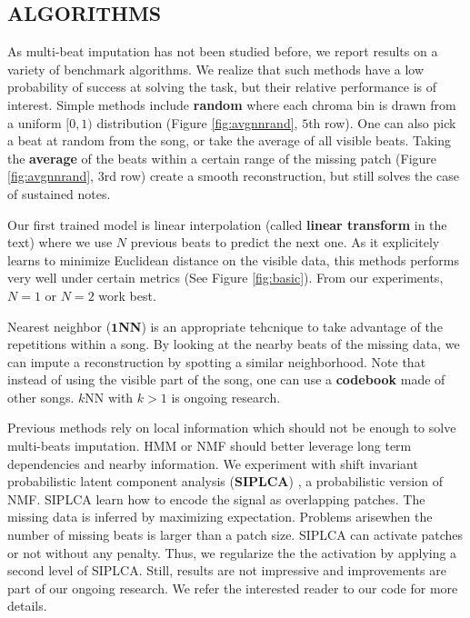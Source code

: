 \documentclass{article}
\begin{document}
\subsection{ALGORITHMS}
\label{ssec:algo}
As multi-beat imputation has not been studied before, we report
results on a variety of benchmark algorithms. We realize that such
methods have a low probability of success at solving the task, but
their relative performance is of interest.  Simple methods include
\textbf{random} where each chroma bin is drawn from a uniform $[0,1)$
distribution (Figure \ref{fig:avgnnrand}, $5$th row).  One can also
pick a beat at random from the song, or take the average of all
visible beats. Taking the \textbf{average} of the beats within a certain
range of the missing patch (Figure \ref{fig:avgnnrand}, $3$rd row)
create a smooth reconstruction, but still solves the case of
sustained notes.

Our first trained model is linear interpolation (called \textbf{linear
  transform} in the text) where we use $N$ previous beats to predict
the next one.  As it explicitely learns to minimize Euclidean distance
on the visible data, this methods performs very well under certain
metrics (See Figure \ref{fig:basic}). From our experiments, $N=1$ or
$N=2$ work best.

Nearest neighbor ($\mathbf{1}$\textbf{NN}) is an appropriate tehcnique
to take advantage of the repetitions within a song. By looking at the
nearby beats of the missing data, we can impute a reconstruction by
spotting a similar neighborhood. Note that instead of using the
visible part of the song, one can use a \textbf{codebook} made of
other songs.  $k$NN with $k>1$ is ongoing research.

Previous methods rely on local information which should not be enough
to solve multi-beats imputation. HMM or NMF should better leverage
long term dependencies and nearby information.  We experiment with
shift invariant probabilistic latent component analysis
(\textbf{SIPLCA}) \cite{Smaragdis2009,Weiss2010}, a probabilistic
version of NMF. SIPLCA learn how to encode the signal as overlapping
patches. The missing data is inferred by maximizing expectation.
Problems arisewhen the number of missing beats is larger than a patch
size. SIPLCA can activate patches or not without any penalty. Thus, we
regularize the the activation by applying a second level of SIPLCA.
Still, results are not impressive and improvements are part of our
ongoing research. We refer the interested reader to our code for more
details.
\end{document}
